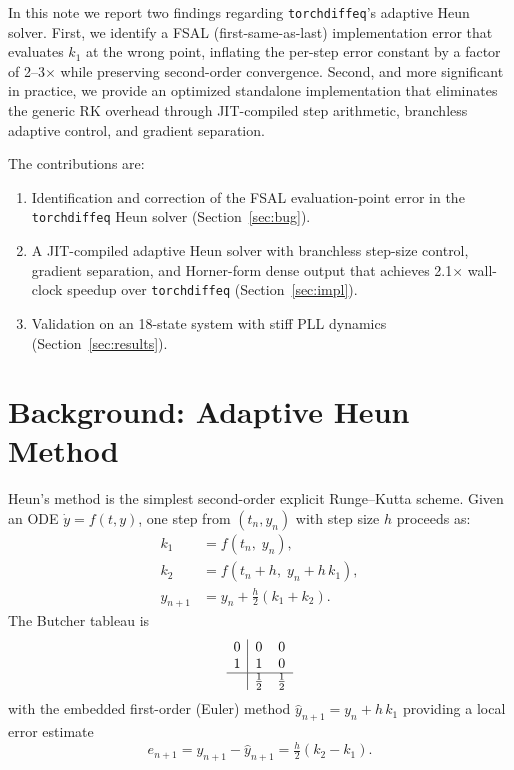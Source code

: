 \documentclass[11pt]{article}
\begin{document}
In this note we report two findings regarding \texttt{torchdiffeq}'s
adaptive Heun solver.  First, we identify a FSAL (first-same-as-last)
implementation error that evaluates $k_1$ at the wrong point, inflating
the per-step error constant by a factor of 2--3$\times$ while preserving
second-order convergence.  Second, and more significant in practice, we
provide an optimized standalone implementation that eliminates the
generic RK overhead through JIT-compiled step arithmetic, branchless
adaptive control, and gradient separation.

The contributions are:
\begin{enumerate}
\item Identification and correction of the FSAL evaluation-point error
      in the \texttt{torchdiffeq} Heun solver (Section~\ref{sec:bug}).
\item A JIT-compiled adaptive Heun solver with branchless step-size
      control, gradient separation, and Horner-form dense output that
      achieves 2.1$\times$ wall-clock speedup over \texttt{torchdiffeq}
      (Section~\ref{sec:impl}).
\item Validation on an 18-state system with stiff PLL dynamics
      (Section~\ref{sec:results}).
\end{enumerate}

\section{Background: Adaptive Heun Method}
\label{sec:background}

Heun's method is the simplest second-order explicit Runge--Kutta scheme.
Given an ODE $\dot{y} = f(t, y)$, one step from $(t_n, y_n)$ with
step size $h$ proceeds as:
\begin{align}
  k_1 &= f(t_n,\; y_n), \label{eq:k1} \\
  k_2 &= f(t_n + h,\; y_n + h\,k_1), \label{eq:k2} \\
  y_{n+1} &= y_n + \tfrac{h}{2}(k_1 + k_2). \label{eq:heun}
\end{align}
The Butcher tableau is
\[
\begin{array}{c|cc}
0 & 0 & 0 \\
1 & 1 & 0 \\
\hline
  & \tfrac12 & \tfrac12
\end{array}
\]
with the embedded first-order (Euler) method $\hat{y}_{n+1} = y_n + h\,k_1$
providing a local error estimate
\begin{equation}
  e_{n+1} = y_{n+1} - \hat{y}_{n+1} = \tfrac{h}{2}(k_2 - k_1).
  \label{eq:err}
\end{equation}
\end{document}
